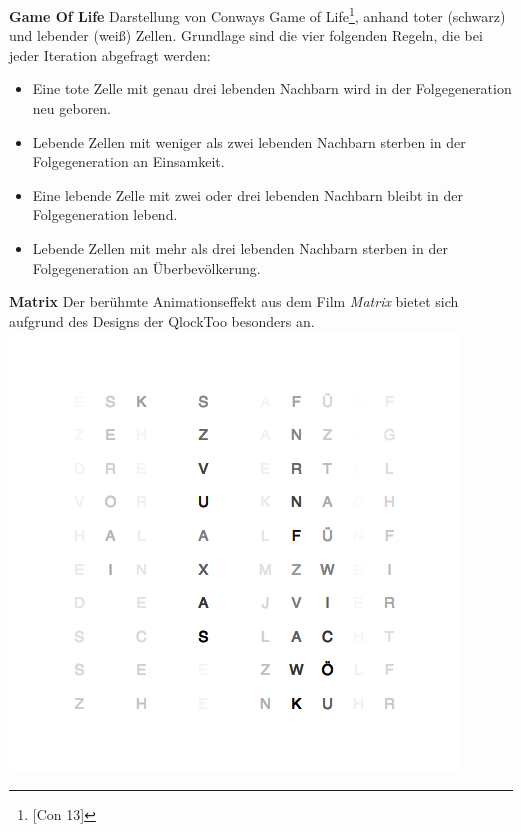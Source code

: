 \begin{multicols}{2}
\textbf{Game Of Life}
Darstellung von Conways Game of Life\footnote{[Con 13]}, anhand toter (schwarz) und lebender (weiß) Zellen.
Grundlage sind die vier folgenden Regeln, die bei jeder Iteration abgefragt werden:
\begin{itemize}
    \item Eine tote Zelle mit genau drei lebenden Nachbarn wird in der Folgegeneration neu geboren.
    \item Lebende Zellen mit weniger als zwei lebenden Nachbarn sterben in der Folgegeneration an Einsamkeit.
    \item Eine lebende Zelle mit zwei oder drei lebenden Nachbarn bleibt in der Folgegeneration lebend.
    \item Lebende Zellen mit mehr als drei lebenden Nachbarn sterben in der Folgegeneration an Überbevölkerung.
\end{itemize}

\textbf{Matrix}
Der berühmte Animationseffekt aus dem Film \emph{Matrix} bietet sich aufgrund des Designs der QlockToo besonders an.
\includegraphics[width=\columnwidth]{Abbildungen/Software/Demo/Matrix}


\end{multicols}
